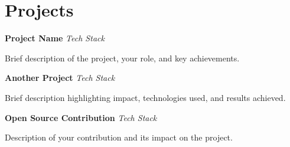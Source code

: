 
\section{Projects}
\begin{cvitems} %
    \item {\textbf{Project Name} \hfill \textit{Tech Stack}}
    \item {\small Brief description of the project, your role, and key achievements.}
    \vspace{2mm}
    
    \item {\textbf{Another Project} \hfill \textit{Tech Stack}}
    \item {\small Brief description highlighting impact, technologies used, and results achieved.}
    
    \item {\textbf{Open Source Contribution} \hfill \textit{Tech Stack}}
    \item {\small Description of your contribution and its impact on the project.}
\end{cvitems}
